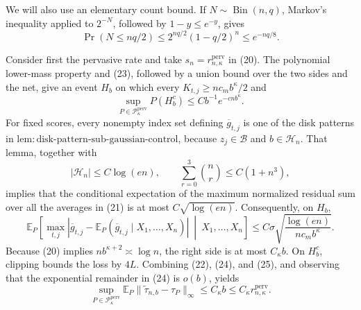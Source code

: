 We will also use an elementary count bound.  If \(N\sim\operatorname{Bin}(n,q)\), Markov's inequality applied to \(2^{-N}\), followed by \(1-y\le e^{-y}\), gives
\[
 \Pr(N\le nq/2)
 \le2^{nq/2}(1-q/2)^n
 \le e^{-nq/8}. \tag{23}
\]

Consider first the pervasive rate and take \(s_n=r_{n,\kappa}^{\mathrm{perv}}\) in (20).  The polynomial lower-mass property and (23), followed by a union bound over the two sides and the net, give an event \(H_b\) on which every \(K_{t,j}\ge nc_mb^{\kappa}/2\) and
\[
 \sup_{P\in\mathcal P_{\kappa}^{\mathrm{perv}}}P(H_b^c)
 \le Cb^{-1}e^{-cn b^{\kappa}}. \tag{24}
\]
For fixed scores, every nonempty index set defining \(\overline g_{t,j}\) is one of the disk patterns in \(\mathrm{lem:disk\text{-}pattern\text{-}sub\text{-}gaussian\text{-}control}\), because \(z_j\in\mathcal B\) and \(b\in\mathcal H_n\).  That lemma, together with
\[
 |\mathcal H_n|\le C\log(en),
 \qquad
 \sum_{r=0}^3\binom nr\le C(1+n^3),
\]
implies that the conditional expectation of the maximum normalized residual sum over all the averages in (21) is at most \(C\sqrt{\log(en)}\).  Consequently, on \(H_b\),
\[
 \mathbb E_P\left[
 \max_{t,j}\left|
 \overline g_{t,j}
 -\mathbb E_P(\overline g_{t,j}\mid X_1,\ldots,X_n)
 \right|
 \ \middle|\ X_1,\ldots,X_n\right]
 \le C\sigma\sqrt{\frac{\log(en)}{n c_mb^{\kappa}}}. \tag{25}
\]
Because (20) implies \(nb^{\kappa+2}\asymp\log n\), the right side is at most \(C_{\kappa}b\).  On \(H_b^c\), clipping bounds the loss by \(4L\).  Combining (22), (24), and (25), and observing that the exponential remainder in (24) is \(o(b)\), yields
\[
 \sup_{P\in\mathcal P_{\kappa}^{\mathrm{perv}}}
 \mathbb E_P\lVert\widetilde\tau_{n,b}-\tau_P\rVert_{\infty}
 \le C_{\kappa}b
 \le C_{\kappa}r_{n,\kappa}^{\mathrm{perv}}. \tag{26}
\]

